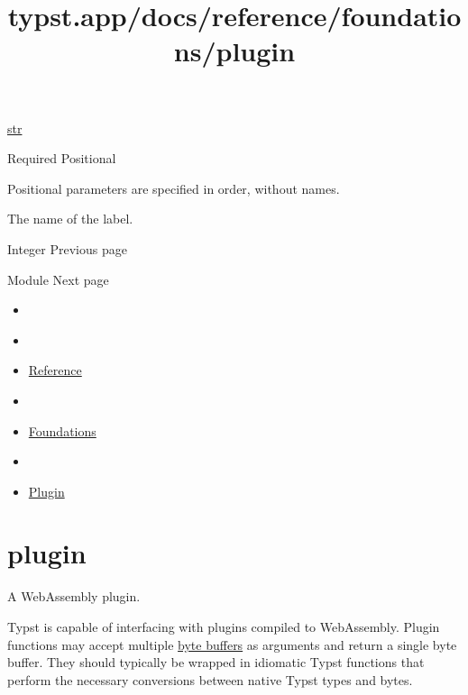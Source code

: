 \href{/docs/reference/foundations/str/}{str}

{Required} {{ Positional }}

\label{constructor-name-positional-tooltip}
Positional parameters are specified in order, without names.

The name of the label.

\href{/docs/reference/foundations/int/}{\pandocbounded{}}

{ Integer } { Previous page }

\href{/docs/reference/foundations/module/}{\pandocbounded{}}

{ Module } { Next page }


\title{typst.app/docs/reference/foundations/plugin}

\begin{itemize}
\tightlist
\item
  \href{/docs}{}
\item
  
\item
  \href{/docs/reference/}{Reference}
\item
  
\item
  \href{/docs/reference/foundations/}{Foundations}
\item
  
\item
  \href{/docs/reference/foundations/plugin/}{Plugin}
\end{itemize}

\section{\texorpdfstring{{ plugin }}{ plugin }}\label{summary}

A WebAssembly plugin.

Typst is capable of interfacing with plugins compiled to WebAssembly.
Plugin functions may accept multiple
\href{/docs/reference/foundations/bytes/}{byte buffers} as arguments and
return a single byte buffer. They should typically be wrapped in
idiomatic Typst functions that perform the necessary conversions between
native Typst types and bytes.

